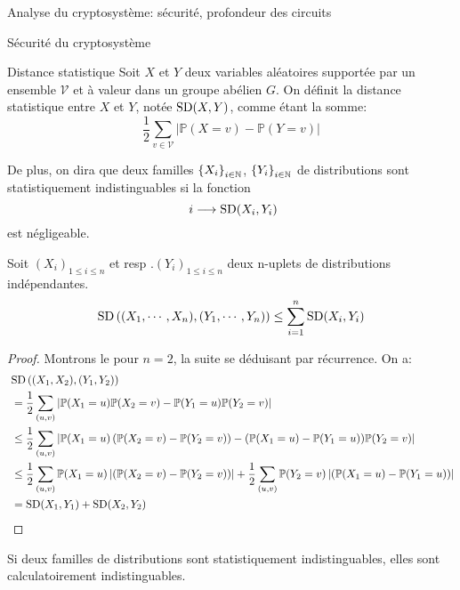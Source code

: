 \begin{section}{Analyse du cryptosystème: sécurité, profondeur des circuits}
	\begin{subsection}{Sécurité du cryptosystème}

	\begin{definition}{Distance statistique}
	Soit $X$ et $Y$ deux variables aléatoires supportée par
	un ensemble $\mathcal{V}$ et à valeur 
	dans un groupe abélien $G$. On définit la distance 
	statistique entre $X$ et $Y$, notée $\text{SD}(X,Y)$, 
	comme étant la somme:
	\[ \frac{1}{2} \sum_{v \in \mathcal{V}} |\mathbb{P}(X = v) -
	\mathbb{P}(Y = v)| \]

	De plus, on dira que deux familles ${\{X_i\}}_{i \in \mathbb{N}}$, ${\{Y_i\}}_{i \in \mathbb{N}}$
	de distributions sont statistiquement indistinguables si 
	la fonction 
	\[ i \longrightarrow \SD(X_i, Y_i) \]
	est négligeable.

	\end{definition}
	\begin{prop} \label{sd_add}
	Soit ${(X_i)}_{1\leq i \leq n}$ et resp .${(Y_i)}_{1\leq i\leq n}$
	deux n-uplets de distributions indépendantes.
	\[ \text{SD}\left((X_1,\cdots,X_n), (Y_1, \cdots, Y_n)\right) \leq \sum_{i=1}^n \text{SD}(X_i,Y_i) \]
	\end{prop}
	\begin{proof}
	Montrons le pour $n = 2$, la suite se déduisant par récurrence.
	On a:
	\begin{align*}
		&\SD\left((X_1,X_2),(Y_1,Y_2)\right) \\
		&= \frac{1}{2} \sum_{(u,v)}\left| \PP(X_1=u)\PP(X_2=v) -
		\PP(Y_1=u)\PP(Y_2=v) \right| \\ 
		&\leq 
		\frac{1}{2} \sum_{(u,v)}\left| \PP(X_1=u)\left(\PP(X_2=v) - \PP(Y_2 = v)\right)
		- (\PP(X_1 = u) - \PP(Y_1=u))\PP(Y_2=v) \right| \\
		&\leq
		\frac{1}{2} \sum_{(u,v)} \PP(X_1 = u)
		\left|\left(\PP(X_2=v) - \PP(Y_2 = v)\right) \right| + 
		\frac{1}{2} \sum_{(u,v)}\PP(Y_2=v)\left|(\PP(X_1 = u) - \PP(Y_1=u)) \right| \\
		&= \SD(X_1, Y_1) + \SD(X_2, Y_2)
	\end{align*}
	\end{proof}
	\begin{prop}
	Si deux familles de distributions sont statistiquement
	indistinguables, elles sont calculatoirement indistinguables.
	\end{prop} 


\end{subsection}
\end{section}
